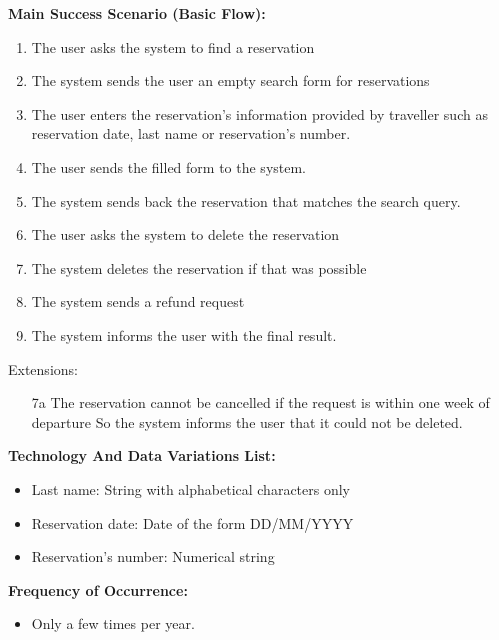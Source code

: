 \textbf{Main Success Scenario (Basic Flow):}
\begin{enumerate}
\item The user asks the system to find a reservation
\item The system sends the user an empty search form for reservations
\item The user enters the reservation's information provided by traveller such as reservation date, last name or reservation's number.
\item The user sends the filled form to the system.
\item The system sends back the reservation that matches the search query.
\item The user asks the system to delete the reservation
\item The system deletes the reservation if that was possible
\item The system sends a refund request
\item The system informs the user with the final result.
\end{enumerate}
Extensions:
\begin{enumerate}
\item[7a] The reservation cannot be cancelled if the request is within one week of departure
So the system informs the user that it could not be deleted.
\end{enumerate}
\textbf{Technology And Data Variations List:} 
\begin{itemize}
    \item Last name: String with alphabetical characters only
    \item Reservation date: Date of the form DD/MM/YYYY
    \item Reservation's number: Numerical string
\end{itemize}
\textbf{Frequency of Occurrence:}
\begin{itemize}
    \item Only a few times per year.
\end{itemize}
